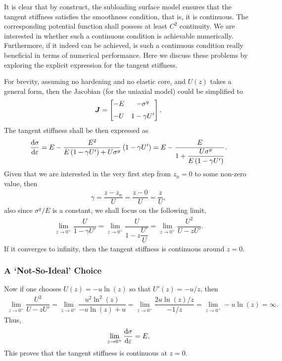 It is clear that by construct, the subloading surface model ensures that the tangent stiffness satisfies the smoothness condition, that is, it is continuous. The corresponding potential function shall possess at least $C^2$ continuity.
We are interested in whether such a continuous condition is achievable numerically.
Furthermore, if it indeed can be achieved, is such a continuous condition really beneficial in terms of numerical performance.
Here we discuss these problems by exploring the explicit expression for the tangent stiffness.

For brevity, assuming no hardening and no elastic core, and $U\left(z\right)$ takes a general form, then the Jacobian (for the uniaxial model) could be simplified to
\begin{gather}
    \bm{J}=\begin{bmatrix}
        -E & -\sigma^y    \\[2mm]
        -U & 1-\gamma{}U'
    \end{bmatrix}.
\end{gather}
The tangent stiffness shall be then expressed as
\begin{gather}
    \dfrac{\mathrm{d}\sigma}{\mathrm{d}\varepsilon}=E-\dfrac{E^2}{E\left(1-\gamma{}U'\right)+U\sigma^y}\left(1-\gamma{}U'\right)=E-\dfrac{E}{1+\dfrac{U\sigma^y}{E\left(1-\gamma{}U'\right)}}.
\end{gather}
Given that we are interested in the very first step from $z_n=0$ to some non-zero value, then
\begin{gather}
    \gamma=\dfrac{z-z_n}{U}=\dfrac{z-0}{U}=\dfrac{z}{U},
\end{gather}
also since $\sigma^y/E$ is a constant, we shall focus on the following limit,
\begin{gather}\label{eq:weak_limit}
    \lim\limits_{z\to0^+}\dfrac{U}{1-\gamma{}U'}=\lim\limits_{z\to0^+}\dfrac{U}{1-z\dfrac{U'}{U}}=\lim\limits_{z\to0^+}\dfrac{U^2}{U-zU'}.
\end{gather}
If it converges to infinity, then the tangent stiffness is continuous around $z=0$.
\subsubsection{A `Not-So-Ideal' Choice}
Now if one chooses $U\left(z\right)=-u\ln\left(z\right)$ so that $U'\left(z\right)=-u/z$, then
\begin{gather}
    \lim\limits_{z\to0^+}\dfrac{U^2}{U-zU'}=\lim\limits_{z\to0^+}\dfrac{u^2\ln^2\left(z\right)}{-u\ln\left(z\right)+u}=\lim\limits_{z\to0^+}\dfrac{2u\ln\left(z\right)/z}{-1/z}=\lim\limits_{z\to0^+}-u\ln\left(z\right)=\infty.
\end{gather}
Thus,
\begin{gather}
    \lim\limits_{z\to0^+}\dfrac{\mathrm{d}\sigma}{\mathrm{d}\varepsilon}=E.
\end{gather}
This proves that the tangent stiffness is continuous at $z=0$.

